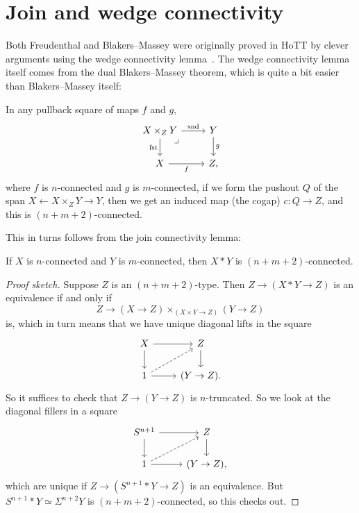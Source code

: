 \documentclass[10pt,oneside,leqno,openright]{memoir}
\begin{document}
\section{Join and wedge connectivity}

Both Freudenthal and Blakers--Massey were originally proved in HoTT by clever
arguments using the wedge connectivity
lemma~\parencite{LumsdaineLicata,BlakersMasseyHoTT}.
The wedge connectivity lemma itself comes from the dual Blakers--Massey theorem, which is quite a bit easier than Blakers--Massey itself:

\begin{theorem}
  \label{thm:dual-BM}
  In any pullback square of maps $f$ and $g$,
  \[
    \begin{tikzcd}
      X\times_ZY \ar[r,"\snd"]\ar[d,"\fst"']\pbcorner & Y\ar[d,"g"] \\
      X \ar[r,"f"'] & Z,
    \end{tikzcd}
  \]
  where $f$ is $n$-connected and $g$ is $m$-connected, if we form the pushout $Q$ of
  the span $X \leftarrow X\times_ZY \to Y$, then we get an induced
  map (the cogap) $c : Q \to Z$, and this is $(n+m+2)$-connected.
\end{theorem}
This in turns follows from the join connectivity lemma:
\begin{lemma}
  \label{lem:join-connectivity}
  If $X$ is $n$-connected and $Y$ is $m$-connected, then $X*Y$ is $(n+m+2)$-connected.
\end{lemma}
\begin{proof}[Proof sketch]
  Suppose $Z$ is an $(n+m+2)$-type.
  Then $Z \to (X*Y \to Z)$ is an equivalence if and only if
  \[Z \to (X \to Z) \times_{(X\times Y \to Z)} (Y \to Z)\]
  is, which in turn means that we have unique diagonal lifts in the square
  \[
    \begin{tikzcd}
      X \ar[r]\ar[d] & Z \ar[d] \\
      1 \ar[r]\ar[ur,dashed] & (Y \to Z).
    \end{tikzcd}
  \]
  So it suffices to check that $Z \to (Y \to Z)$ is $n$-truncated.
  So we look at the diagonal fillers in a square
  \[
    \begin{tikzcd}
      S^{n+1} \ar[r]\ar[d] & Z\ar[d] \\
      1 \ar[r]\ar[ur,dashed] & (Y \to Z),
    \end{tikzcd}
  \]
  which are unique if $Z \to (S^{n+1}*Y \to Z)$ is an equivalence. But
  $S^{n+1}*Y \simeq \Sigma^{n+2}Y$ is $(n+m+2)$-connected, so this checks out.
\end{proof}
\end{document}
